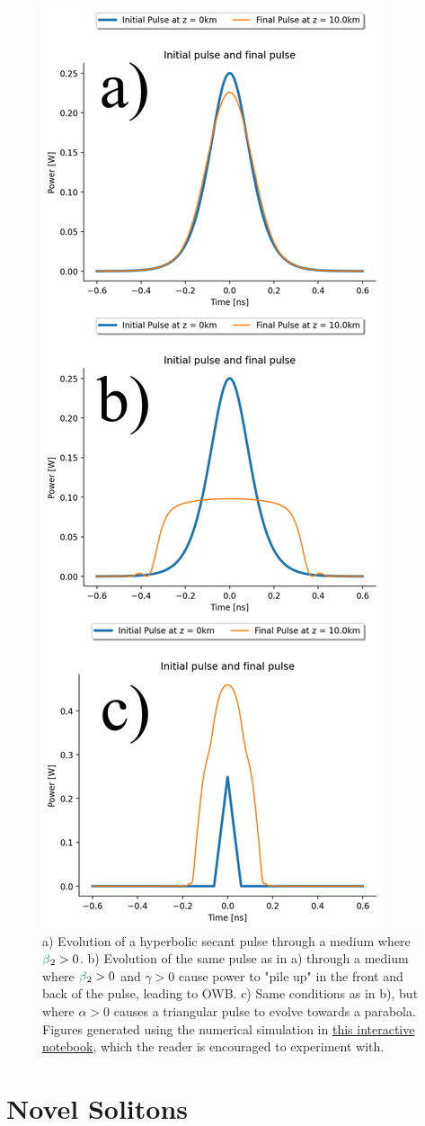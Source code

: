 \begin{figure}
    \centering
    \includegraphics[width=0.5\linewidth]{figures/OWB_and_similariton.png}
    \caption{a) Evolution of a hyperbolic secant pulse through a medium where $\betag_2>0$. b) Evolution of the same pulse as in a) through a medium where $\betag_2>0$ and $\gamma>0$ cause power to "pile up" in the front and back of the pulse, leading to OWB. c) Same conditions as in b), but where $\alpha>0$ causes a triangular pulse to evolve towards a parabola. Figures generated using the numerical simulation in \href{https://colab.research.google.com/drive/1qtMcXElXn4VBntfCgXIGGkyDfiGicElx?usp=sharing}{this interactive notebook}, which the reader is encouraged to experiment with.  }
    \label{fig:OWB_and_similariton}
\end{figure}


\section{Novel Solitons}
